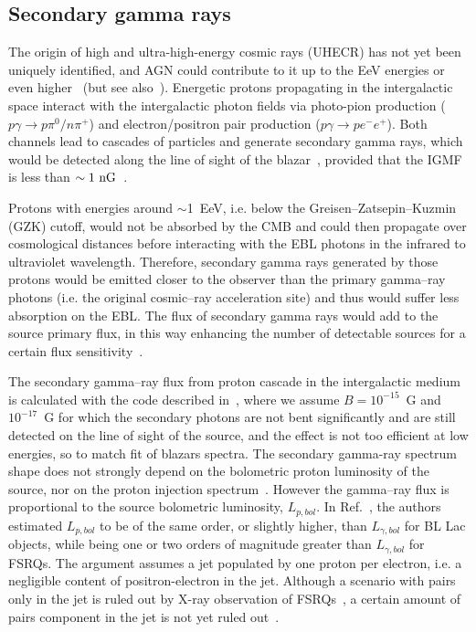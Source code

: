 \documentclass[final,5p]{elsarticle}
\begin{document}
\subsection{Secondary gamma rays}
The origin of high and ultra-high-energy cosmic rays (UHECR) has not yet been uniquely identified, and AGN could contribute to it up to the EeV energies or even higher~\cite{AGNUHECR} (but see also~\cite{TanakaInoue2016b}). Energetic protons propagating in the intergalactic space interact with the intergalactic photon fields via photo-pion production ($p\gamma\rightarrow p\pi^0 /  n\pi^{+}$)  and electron/positron pair production ($p\gamma\rightarrow pe^{-}e^{+}$). Both channels lead to cascades of particles and generate secondary gamma rays, which would be detected along the line of sight of the blazar~\cite{EsseyKusenko2010, Essey2010, Essey2011, Razzaque2012, Murase2012, Aharonian2013, Takami2013, ZhengKang2013}, provided that the IGMF is less than $\sim1~{\rm nG}$~\cite{Essey2011,Murase2012}. 

Protons with energies around $\sim$1~EeV, i.e. below the Greisen--Zatsepin--Kuzmin (GZK)\cite{GZK1,GZK2} cutoff, would not be absorbed by the CMB and could then propagate over cosmological distances before interacting with the EBL photons in the infrared to ultraviolet wavelength. Therefore, secondary gamma rays generated by those protons would be emitted closer to the observer than the primary gamma--ray photons (i.e. the original cosmic--ray acceleration site) and thus would suffer less absorption on the EBL. The flux of secondary gamma rays would add to the source primary flux, in this way enhancing the number of detectable sources for a certain flux sensitivity~\cite{Yoshi2ndGamma}. 

The secondary gamma--ray flux from proton cascade in the intergalactic medium is calculated with the code described in~\cite{OlegCode1,OlegCode2}, where we assume $B=10^{-15}$~G and $10^{-17}$~G for which the secondary photons are not bent significantly and are still detected on the line of sight of the source, and the effect is not too efficient at low energies, so to match fit of blazars spectra. The secondary gamma-ray spectrum shape does not strongly depend on the bolometric proton luminosity of the source, nor on the proton injection spectrum~\cite{Essey2011,EsseyKusenko2010}. However the gamma--ray flux is proportional to the source bolometric luminosity, $L_{p,bol}$. In Ref.~\cite{PBol}, the authors estimated $L_{p,bol}$ to be of the same order, or slightly higher, than $L_{\gamma,bol}$ for BL Lac objects, while being one or two orders of magnitude greater than  $L_{\gamma,bol}$ for FSRQs. The argument assumes a jet populated by one proton per electron, i.e. a negligible content of positron-electron in the jet.  Although a scenario with pairs only in the jet is ruled out by X-ray observation of FSRQs~\cite{Sikora2000}, a certain amount of pairs component in the jet is not yet ruled out~\cite{ Sikora2000,Sikora2005,Bottcher2013,Ghisellini2012}.
\end{document}
